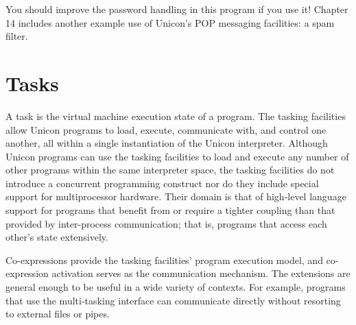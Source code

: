 
\noindent
You should improve the password handling in this program if you use it!
Chapter 14 includes another example use of
Unicon's POP messaging facilities: a spam filter.

\section{Tasks}

A task is the virtual machine execution state of a program. The tasking
facilities allow Unicon programs to load, execute, communicate with,
and control one another, all within a single instantiation of the
Unicon interpreter. 
Although Unicon programs can use the tasking facilities to load and
execute any number of other programs within the same interpreter space,
the tasking facilities do not introduce a concurrent programming
construct nor do they include special support for multiprocessor
hardware. Their domain is that of high-level language support for
programs that benefit from or require a tighter coupling than that
provided by inter-process communication; that is, programs that access
each other's state extensively.

Co-expressions provide the tasking facilities' program
execution model, and co-expression activation serves as the
communication mechanism. The extensions are general enough to be useful
in a wide variety of contexts. For example, programs that use the
multi-tasking interface can communicate directly without resorting to
external files or pipes.

